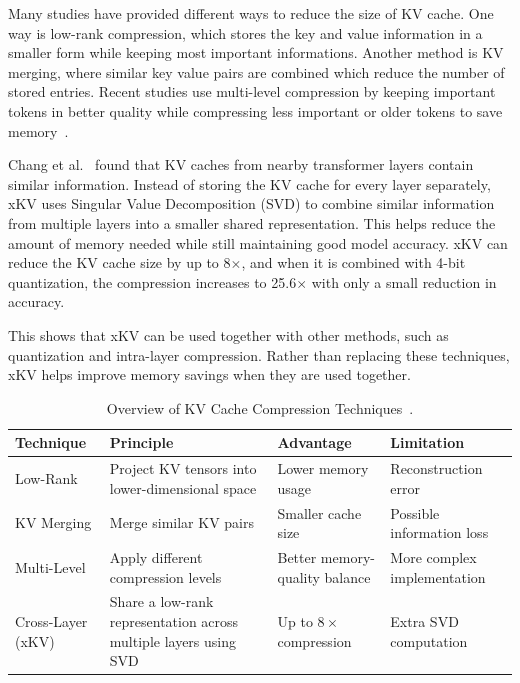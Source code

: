 \documentclass[conference]{IEEEtran}
\begin{document}
Many studies have provided different ways to reduce the size of KV cache. One way is low-rank compression, which stores the key and value information in a smaller form while keeping most important informations. Another method is KV merging, where similar key value pairs are combined which reduce the number of stored entries. Recent studies use multi-level compression by keeping important tokens in better quality while compressing less important or older tokens to save memory~\cite{shan2025cognitivememoryllms}.

Chang et al.~\cite{chang2025xkv} found that KV caches from nearby transformer layers contain similar information. Instead of storing the KV cache for every layer separately, xKV uses Singular Value Decomposition (SVD) to combine similar information from multiple layers into a smaller shared representation. This helps reduce the amount of memory needed while still maintaining good model accuracy. xKV can reduce the KV cache size by up to 8$\times$, and when it is combined with 4-bit quantization, the compression increases to 25.6$\times$ with only a small reduction in accuracy.

This shows that xKV can be used together with other methods, such as quantization and intra-layer compression. Rather than replacing these techniques, xKV helps improve memory savings when they are used together.

\begin{table}[htbp]
	\centering
	\caption{Overview of KV Cache Compression Techniques~\cite{shan2025cognitivememoryllms,chang2025xkv}.}
	\label{tab:kv_compression}
	\small
	\begin{tabularx}{\linewidth}{lXXX}
		\toprule
		\textbf{Technique} & \textbf{Principle}                                               & \textbf{Advantage}            & \textbf{Limitation}         \\
		\midrule
		Low-Rank           & Project KV tensors into lower-dimensional space                  & Lower memory usage            & Reconstruction error        \\
		\midrule
		KV Merging         & Merge similar KV pairs                                           & Smaller cache size            & Possible information loss   \\
		\midrule
		Multi-Level        & Apply different compression levels                               & Better memory-quality balance & More complex implementation \\
		\midrule
		Cross-Layer (xKV)  & Share a low-rank representation across multiple layers using SVD & Up to $8\times$ compression   & Extra SVD computation       \\
		\bottomrule
	\end{tabularx}
\end{table}
\end{document}
